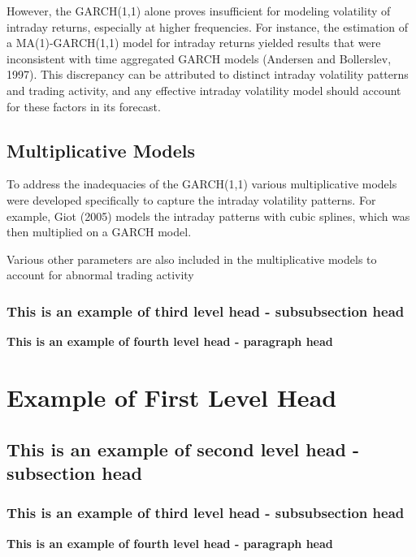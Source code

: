 \documentclass[12pt,a4paper]{article}
\newcommand{\subsubsubsection}[1]{%
  \vspace{\baselineskip}%
  \noindent\textbf{#1\\}\quad%
}
\begin{document}
However, the GARCH(1,1) alone proves insufficient for modeling volatility of intraday returns, especially 
at higher frequencies. For instance, the estimation of a MA(1)-GARCH(1,1) model for intraday returns 
yielded results that were inconsistent with time aggregated GARCH models (Andersen and Bollerslev, 1997). 
This discrepancy can be attributed to distinct intraday volatility patterns and trading activity, and 
any effective intraday volatility model should account for these factors in its forecast.

\subsection{Multiplicative Models}\label{subsec1}
To address the inadequacies of the GARCH(1,1) various multiplicative models were developed 
specifically to capture the intraday volatility patterns. For example, Giot (2005) models the intraday 
patterns with cubic splines, which was then multiplied on a GARCH model. 

Various other parameters are also included in the multiplicative models to account for 
abnormal trading activity

\subsubsection{This is an example of third level head - subsubsection head}\label{subsubsec1}
\lipsum[6]

\subsubsubsection{This is an example of fourth level head - paragraph head}
\lipsum[7]


\section{Example of First Level Head}\label{sec3}

\subsection{This is an example of second level head - subsection head}\label{subsec2}

\subsubsection{This is an example of third level head - subsubsection head}\label{subsubsec2}
\lipsum[8]

\subsubsubsection{This is an example of fourth level head - paragraph head}
\lipsum[9]
\end{document}
